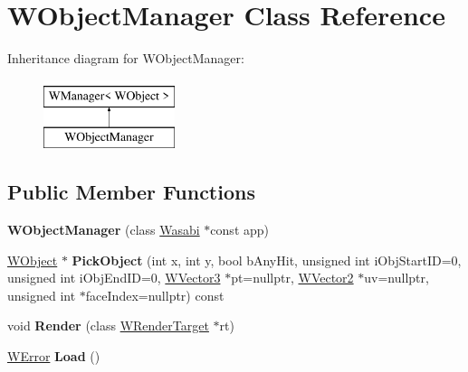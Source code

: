 \hypertarget{class_w_object_manager}{}\section{W\+Object\+Manager Class Reference}
\label{class_w_object_manager}
Inheritance diagram for W\+Object\+Manager\+:\begin{figure}[H]
\begin{center}
\leavevmode
\includegraphics[height=2.000000cm]{class_w_object_manager}
\end{center}
\end{figure}
\subsection*{Public Member Functions}
\begin{DoxyCompactItemize}
\item 
{\bfseries W\+Object\+Manager} (class \hyperlink{class_wasabi}{Wasabi} $\ast$const app)\hypertarget{class_w_object_manager_a6ac9e43e828feff89da389bff3504bbd}{}\label{class_w_object_manager_a6ac9e43e828feff89da389bff3504bbd}

\item 
\hyperlink{class_w_object}{W\+Object} $\ast$ {\bfseries Pick\+Object} (int x, int y, bool b\+Any\+Hit, unsigned int i\+Obj\+Start\+ID=0, unsigned int i\+Obj\+End\+ID=0, \hyperlink{class_w_vector3}{W\+Vector3} $\ast$pt=nullptr, \hyperlink{class_w_vector2}{W\+Vector2} $\ast$uv=nullptr, unsigned int $\ast$face\+Index=nullptr) const \hypertarget{class_w_object_manager_a589763cdee79fc0410ba560fcae327a0}{}\label{class_w_object_manager_a589763cdee79fc0410ba560fcae327a0}

\item 
void {\bfseries Render} (class \hyperlink{class_w_render_target}{W\+Render\+Target} $\ast$rt)\hypertarget{class_w_object_manager_a7c0543b08ecbc6ddc019402cc62d0c1b}{}\label{class_w_object_manager_a7c0543b08ecbc6ddc019402cc62d0c1b}

\item 
\hyperlink{class_w_error}{W\+Error} {\bfseries Load} ()\hypertarget{class_w_object_manager_abbb11fb7005e059f2057b0d3dfac55a9}{}\label{class_w_object_manager_abbb11fb7005e059f2057b0d3dfac55a9}

\end{DoxyCompactItemize}
